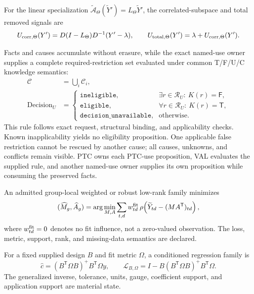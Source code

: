 For the linear specialization
$\widetilde{\mathcal A}_{\Theta}(\widetilde Y')=L_{\Theta}\widetilde Y'$,
the correlated-subspace and total removed signals are
\[
U_{{\rm corr},\Theta}(Y')
=D(I-L_{\Theta})D^{-1}(Y'-\lambda),
\qquad
U_{{\rm total},\Theta}(Y')
=\lambda+U_{{\rm corr},\Theta}(Y').
\]

Facts and causes accumulate without erasure, while the exact named-use owner
supplies a complete required-restriction set evaluated under common T/F/U/C
knowledge semantics:
\begin{equation}
\begin{aligned}
\mathcal C&=\bigcup_i\mathcal C_i,\\
\operatorname{Decision}_U&=
\begin{cases}
\texttt{ineligible},
  &\exists r\in\mathcal R_U:\ K(r)=\mathsf F,\\
\texttt{eligible},
  &\forall r\in\mathcal R_U:\ K(r)=\mathsf T,\\
\texttt{decision\_unavailable},
  &\text{otherwise}.
\end{cases}
\end{aligned}
\label{eq:cause-support}
\end{equation}
This rule follows exact request, structural binding, and applicability checks.
Known inapplicability yields no eligibility proposition. One applicable false
restriction cannot be rescued by another cause; all causes, unknowns, and
conflicts remain visible. PTC owns each PTC-use proposition, VAL evaluates the
supplied rule, and another named-use owner supplies its own proposition while
consuming the preserved facts.

An admitted group-local weighted or robust low-rank family minimizes
\begin{equation}
(\widehat M_g,\widehat A_g)=
\arg\min_{M,A}\sum_{t,d}w^{\rm fit}_{td}
\,\rho\!\left(\widetilde Y_{td}-(MA^{\mathsf T})_{td}\right),
\label{eq:masked-factor}
\end{equation}
where $w^{\rm fit}_{td}=0$ denotes no fit influence, not a zero-valued
observation. The loss, metric, support, rank, and missing-data semantics are
declared.

For a fixed supplied design $B$ and fit metric $\Omega$, a conditioned
regression family is
\begin{equation}
\widehat c=(B^{\mathsf T}\Omega B)^{+}B^{\mathsf T}\Omega y,
\qquad
\mathcal L_{B,\Omega}
=I-B(B^{\mathsf T}\Omega B)^{+}B^{\mathsf T}\Omega .
\label{eq:fixed-regression}
\end{equation}
The generalized inverse, tolerance, units, gauge, coefficient support, and
application support are material state.

